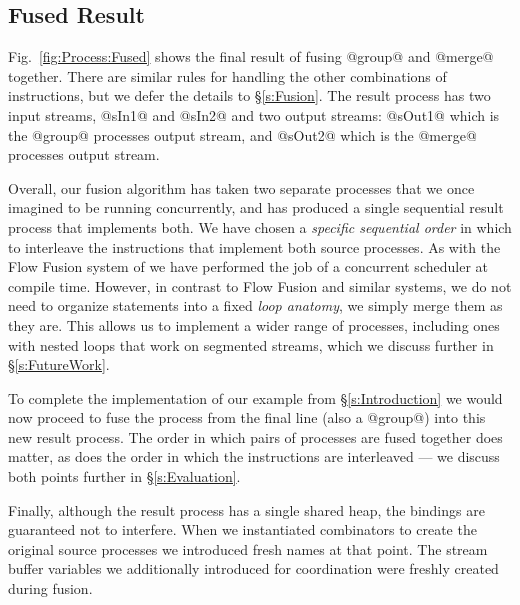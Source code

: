 \subsection{Fused Result}

Fig.~\ref{fig:Process:Fused} shows the final result of fusing @group@ and @merge@ together. There are similar rules for handling the other combinations of instructions, but we defer the details to \S\ref{s:Fusion}. The result process has two input streams, @sIn1@ and @sIn2@ and two output streams: @sOut1@ which is the @group@ processes output stream, and @sOut2@ which is the @merge@ processes output stream. 

Overall, our fusion algorithm has taken two separate processes that we once imagined to be running concurrently, and has produced a single sequential result process that implements both. We have chosen a \emph{specific sequential order} in which to interleave the instructions that implement both source processes. As with the Flow Fusion system of \citet{lippmeier2013data} we have performed the job of a concurrent scheduler at compile time. However, in contrast to Flow Fusion and similar systems, we do not need to organize statements into a fixed \emph{loop anatomy}, we simply merge them as they are. This allows us to implement a wider range of processes, including ones with nested loops that work on segmented streams, which we discuss further in \S\ref{s:FutureWork}. 

To complete the implementation of our example from \S\ref{s:Introduction} we would now proceed to fuse the process from the final line (also a @group@) into this new result process. The order in which pairs of processes are fused together does matter, as does the order in which the instructions are interleaved --- we discuss both points further in \S\ref{s:Evaluation}.

Finally, although the result process has a single shared heap, the bindings are guaranteed not to interfere. When we instantiated combinators to create the original source processes we introduced fresh names at that point. The stream buffer variables we additionally introduced for coordination were freshly created during fusion.

